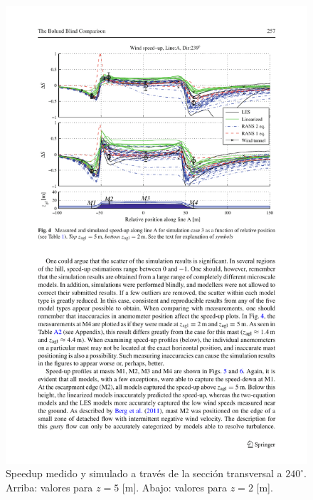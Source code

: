 \documentclass[mathserif,10pt]{beamer}
\begin{document}
\begin{frame}{}
	\begin{figure}[H]
		\centering
		\includegraphics[width=0.9\linewidth,trim={1.7cm 12.3cm 0.9cm 2cm},clip]{fig/an1/bolund2.pdf}%
		\caption{Speedup medido y simulado a través de la sección transversal a $240^\circ$. Arriba: valores para $z=5$ [m]. Abajo: valores para $z=2$ [m].}
		\label{fig:an1_speedup}
	\end{figure}
\end{frame}
\end{document}
